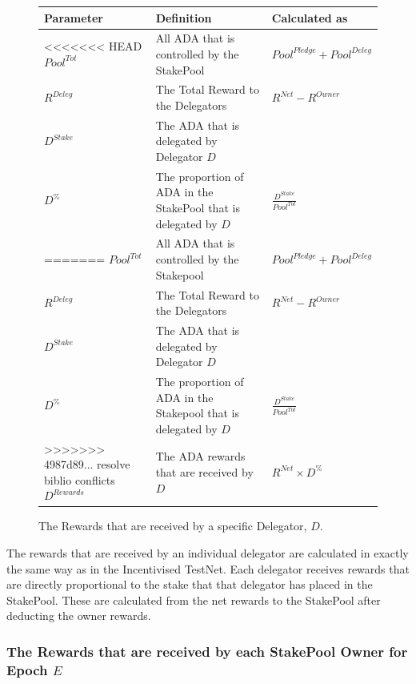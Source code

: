 \documentclass[11pt,a4paper,dvipsnames,twosided,final]{article}
\newcommand{\ada}{ADA{}}
\begin{document}
\begin{figure}[h!]
\begin{center}
\begin{tabular}{||l|p{9cm}|l||}
  \hline \hline
\textbf{Parameter} & \textbf{Definition} & \textbf{Calculated as} \\\hline
<<<<<<< HEAD
${\textit{Pool}}^{Tot}$ & All \ada{} that is controlled by the StakePool & ${\textit{Pool}}^\textit{Pledge} + {\textit{Pool}}^\textit{Deleg}$ \\\hline
$R^{Deleg}$ & The Total Reward to the Delegators & $R^{\textit{Net}} - R^\textit{Owner}$ \\\hline
$D^{Stake}$ & The \ada{} that is delegated by Delegator $D$ & \\\hline
$D^\%$ & The proportion of \ada{} in the StakePool that is delegated by $D$ & $\frac{D^{Stake}}{Pool^{Tot}}$ \\\hline
=======
${\textit{Pool}}^{Tot}$ & All \ada{} that is controlled by the Stakepool & ${\textit{Pool}}^\textit{Pledge} + {\textit{Pool}}^\textit{Deleg}$ \\\hline
$R^{Deleg}$ & The Total Reward to the Delegators & $R^{\textit{Net}} - R^\textit{Owner}$ \\\hline
$D^{Stake}$ & The \ada{} that is delegated by Delegator $D$ & \\\hline
$D^\%$ & The proportion of \ada{} in the Stakepool that is delegated by $D$ & $\frac{D^{Stake}}{Pool^{Tot}}$ \\\hline
>>>>>>> 4987d89... resolve biblio conflicts
$D^{Rewards}$ & The \ada{} rewards that are received by $D$ & $R^{\textit{Net}} \times D^\%$ \\\hline
\hline
\end{tabular}
\end{center}
\caption{The Rewards that are received by a specific Delegator, $D$.}
\end{figure}

\noindent
The rewards that are received by an individual delegator are calculated in exactly the same way as in
the Incentivised TestNet.  Each delegator receives rewards that are directly proportional to the
stake that that delegator has placed in the StakePool.  These are calculated from the net rewards to the
StakePool after deducting the owner rewards.

\clearpage
\subsubsection*{The Rewards that are received by each StakePool Owner for Epoch $E$}
\end{document}
